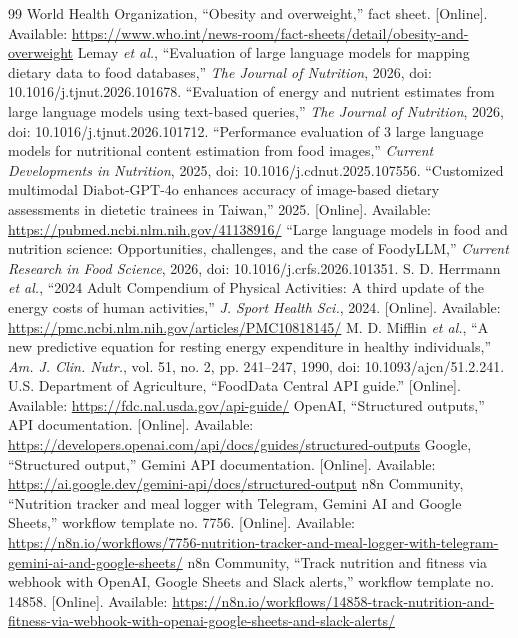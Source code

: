 \documentclass[journal,10pt]{IEEEtran}
\begin{document}
\begin{thebibliography}{99}
 World Health Organization, ``Obesity and overweight,'' fact sheet. [Online]. Available: \url{https://www.who.int/news-room/fact-sheets/detail/obesity-and-overweight}
 Lemay \emph{et al.}, ``Evaluation of large language models for mapping dietary data to food databases,'' \emph{The Journal of Nutrition}, 2026, doi: 10.1016/j.tjnut.2026.101678.
 ``Evaluation of energy and nutrient estimates from large language models using text-based queries,'' \emph{The Journal of Nutrition}, 2026, doi: 10.1016/j.tjnut.2026.101712.
 ``Performance evaluation of 3 large language models for nutritional content estimation from food images,'' \emph{Current Developments in Nutrition}, 2025, doi: 10.1016/j.cdnut.2025.107556.
 ``Customized multimodal Diabot-GPT-4o enhances accuracy of image-based dietary assessments in dietetic trainees in Taiwan,'' 2025. [Online]. Available: \url{https://pubmed.ncbi.nlm.nih.gov/41138916/}
 ``Large language models in food and nutrition science: Opportunities, challenges, and the case of FoodyLLM,'' \emph{Current Research in Food Science}, 2026, doi: 10.1016/j.crfs.2026.101351.
 S. D. Herrmann \emph{et al.}, ``2024 Adult Compendium of Physical Activities: A third update of the energy costs of human activities,'' \emph{J. Sport Health Sci.}, 2024. [Online]. Available: \url{https://pmc.ncbi.nlm.nih.gov/articles/PMC10818145/}
 M. D. Mifflin \emph{et al.}, ``A new predictive equation for resting energy expenditure in healthy individuals,'' \emph{Am. J. Clin. Nutr.}, vol. 51, no. 2, pp. 241--247, 1990, doi: 10.1093/ajcn/51.2.241.
 U.S. Department of Agriculture, ``FoodData Central API guide.'' [Online]. Available: \url{https://fdc.nal.usda.gov/api-guide/}
 OpenAI, ``Structured outputs,'' API documentation. [Online]. Available: \url{https://developers.openai.com/api/docs/guides/structured-outputs}
 Google, ``Structured output,'' Gemini API documentation. [Online]. Available: \url{https://ai.google.dev/gemini-api/docs/structured-output}
 n8n Community, ``Nutrition tracker and meal logger with Telegram, Gemini AI and Google Sheets,'' workflow template no. 7756. [Online]. Available: \url{https://n8n.io/workflows/7756-nutrition-tracker-and-meal-logger-with-telegram-gemini-ai-and-google-sheets/}
 n8n Community, ``Track nutrition and fitness via webhook with OpenAI, Google Sheets and Slack alerts,'' workflow template no. 14858. [Online]. Available: \url{https://n8n.io/workflows/14858-track-nutrition-and-fitness-via-webhook-with-openai-google-sheets-and-slack-alerts/}
\end{thebibliography}
\end{document}
